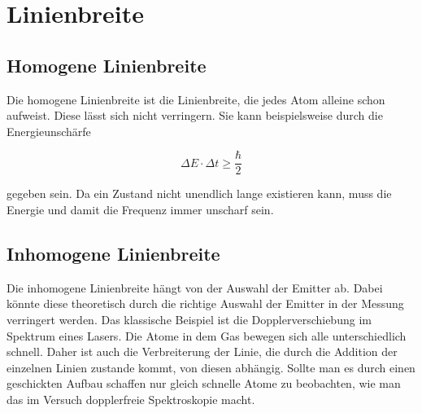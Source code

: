 
\section{Linienbreite}

\subsection{Homogene Linienbreite}

Die homogene Linienbreite ist die Linienbreite, die jedes Atom alleine schon aufweist. Diese lässt sich nicht verringern.
Sie kann beispielsweise durch die Energieunschärfe 

\begin{equation}
    \Delta E \cdot \Delta t  \geq   \frac{\hbar}{2}
\end{equation}

gegeben sein. Da ein Zustand nicht unendlich lange existieren kann, 
muss die Energie und damit die Frequenz immer unscharf sein.


\subsection{Inhomogene Linienbreite}

Die inhomogene Linienbreite hängt von der Auswahl der Emitter ab. Dabei könnte diese
theoretisch durch die richtige Auswahl der Emitter in der Messung verringert werden. Das 
klassische Beispiel ist die Dopplerverschiebung im Spektrum eines Lasers. Die Atome in dem Gas
bewegen sich alle unterschiedlich schnell. Daher ist auch die Verbreiterung der Linie, die
durch die Addition der einzelnen Linien zustande kommt, von diesen abhängig. Sollte man es durch einen
geschickten Aufbau schaffen nur gleich schnelle Atome zu beobachten, wie man 
das im Versuch dopplerfreie Spektroskopie macht. 